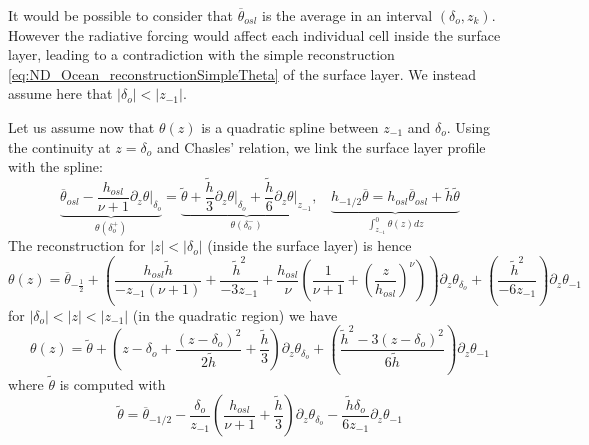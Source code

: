 \begin{remark}
It would be possible to consider that $\overline{\theta}_{osl}$ is
the average in an interval $(\delta_o, z_k)$.
However the radiative forcing would affect each individual cell
inside the surface layer, leading to a contradiction with the simple
reconstruction \eqref{eq:ND_Ocean_reconstructionSimpleTheta}
of the surface layer.
We instead assume here that $|\delta_{o}| < |z_{-1}|$.
\end{remark}
Let us assume now that  $\theta(z)$ is a quadratic spline between
$z_{-1}$ and $\delta_o$.
Using the continuity at $z=\delta_o$ and Chasles' relation,
we link the surface layer profile with the spline:
\begin{equation}
\underbrace{
    \overline{\theta}_{osl} -
    \frac{h_{osl}}{\nu+1}\left. \partial_z \theta
    \right|_{\delta_o}}_{\theta(\delta_o^{+})}
    =
    \underbrace{
    \widetilde{\theta}
    + \frac{\widetilde{h}}{3}
    \left.\partial_z \theta\right|_{\delta_o}
    + \frac{\widetilde{h}}{6}
	\left.\partial_z \theta\right|_{z_{-1}}}_{
	\theta(\delta_o^{-})}
	,
    ~~~~
	\underbrace{
    h_{-1/2} \overline{\theta} = 
    h_{osl}\overline{\theta}_{osl} +\widetilde{h}
    \widetilde{\theta}}_{
    \int_{z_{-1}}^{0}\theta(z) dz
    }
\end{equation}
The reconstruction for $|z|<|\delta_o|$ (inside the surface layer) is hence
\begin{equation}
    \theta(z) =
    \overline{\theta}_{-\frac{1}{2}}
    +
	\left(\frac{h_{osl}\widetilde{h}}{-z_{-1}(\nu+1)} +
	\frac{\widetilde{h}^2}{-3 z_{-1}}
    +
    \frac{h_{osl}}{\nu}\left(
    \frac{1}{\nu+1} + \left(\frac{z}{h_{osl}}
    \right)^\nu
    \right)\right) \partial_z \theta_{\delta_o}
    +
	\left(\frac{\widetilde{h}^2}{-6 z_{-1}}\right)
    \partial_z \theta_{-1}
\end{equation}
for $|\delta_o| < |z| < |z_{-1}|$
(in the quadratic region) we have
\begin{equation}
    \theta(z) =
        \widetilde{\theta}
        +
        \left(
        z-\delta_o + 
        \frac{(z-\delta_o)^2}{2\widetilde{h}}
        + \frac{\widetilde{h}}{3}
        \right)\partial_z \theta_{\delta_o}
        +
        \left(
        \frac{\widetilde{h}^2 - 
        3(z-\delta_o)^2}{6 \widetilde{h}}
        \right)\partial_z \theta_{-1}
\end{equation}
where $\widetilde{\theta}$ is computed with
\begin{equation}
\label{eq:formulaTildeTheta}
\widetilde{\theta} = \overline{\theta}_{-1/2}
	-\frac{\delta_o}{z_{-1}}\left(
\frac{h_{osl}}{\nu+1} + \frac{\widetilde{h}}{3}
\right)\partial_z \theta_{\delta_o}
	- \frac{\widetilde{h}\delta_o}{6z_{-1}}
\partial_z \theta_{-1}
\end{equation}
